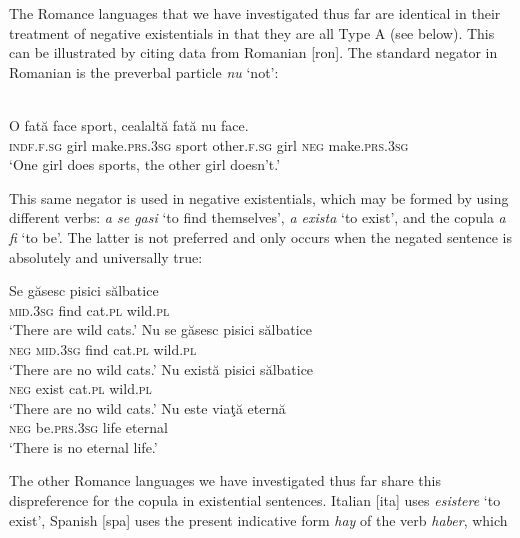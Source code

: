 \documentclass[output=paper]{langsci/langscibook}
\begin{document}
The Romance languages that we have investigated thus far are identical in
their treatment of negative existentials in that they are all Type A (see
 below). This can be illustrated by citing
data from Romanian [ron]. The standard negator in Romanian is the preverbal particle \textit{nu} `not':
%
\begin{exe}\ex
{}\\
    \gll O fată  face sport, cealaltă fată nu face.  \\
\textsc{indf.f.sg}   girl  make.\textsc{prs.3sg} sport other.\textsc{f.sg}
girl \textsc{neg}  make.\textsc{prs.3sg} \\
    \glt `One girl does sports, the other girl doesn't.'
    \end{exe}
%
This same negator is used in negative existentials, which may be formed by
using different verbs: \textit{a se gasi} `to find
themselves', \textit{a exista} `to exist', and the copula
\textit{a fi} `to be'. The latter is not preferred and only occurs
when the negated sentence is absolutely and universally true:
%
\begin{exe}\ex
{}
\begin{xlist}
\ex
    \gll Se găsesc  pisici  sălbatice   \\
\textsc{mid.3sg}  find       cat.\textsc{pl}  wild.\textsc{pl} \\
    \glt `There are wild cats.'
\ex
    \gll Nu se găsesc  pisici  sălbatice \\
    \textsc{neg} \textsc{mid.3sg} find cat.\textsc{pl} wild.\textsc{pl}\\
    \glt `There are no wild cats.'
\ex
    \gll Nu      există   pisici  sălbatice \\
    \textsc{neg}  exist      cat.\textsc{pl}  wild.\textsc{pl}\\
    \glt `There are no wild cats.'
\ex
    \gll Nu   este viaţă eternă\\
    \textsc{neg}  be.\textsc{prs.3sg}  life    eternal\\
\glt `There is no eternal life.'
    \end{xlist}\end{exe}
%
The other Romance languages we have investigated thus far share this
dispreference for the copula in existential sentences. Italian
[ita] uses \textit{esistere} `to exist', Spanish [spa] uses the
present indicative form \textit{hay} of the verb \textit{haber}, which
\end{document}
